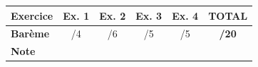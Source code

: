 \documentclass[10pt,a4paper]{article}
\begin{document}
\vspace{5mm}

\begin{tabularx}{\linewidth}{|X|c|c|c|c|c|}
	\hline
	\rowcolor{exolight}
	\textbf{Exercice} & \textbf{Ex. 1} & \textbf{Ex. 2} & \textbf{Ex. 3} & \textbf{Ex. 4} & \textbf{TOTAL} \\
	\hline
	\textbf{Barème} & /4 & /6 & /5 & /5 & \textbf{/20} \\
	\hline
	\textbf{Note} & & & & & \\[6pt]
	\hline
\end{tabularx}
\end{document}
